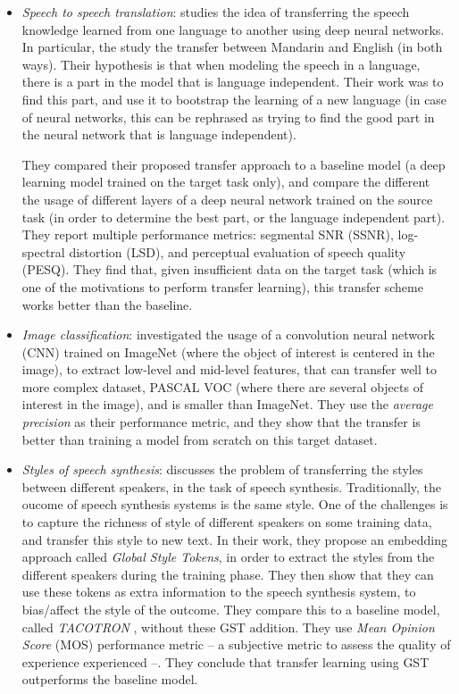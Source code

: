 \begin{itemize}
      \item \textit{Speech to speech translation}: \citep{xu2014cross} studies the idea of transferring the speech knowledge learned from one language to another using deep neural networks. In particular, the study the transfer between Mandarin and English (in both ways). Their hypothesis is that when modeling the speech in a language, there is a part in the model that is language independent. Their work was to find this part, and use it to bootstrap the learning of a new language (in case of neural networks, this can be rephrased as trying to find the good part in the neural network that is language independent).

      They compared their proposed transfer approach to a baseline model (a deep learning model trained on the target task only), and compare the different the usage of different layers of a deep neural network trained on the source task (in order to determine the best part, or the language independent part). They report multiple performance metrics: segmental SNR (SSNR), log-spectral distortion (LSD), and perceptual evaluation of speech quality (PESQ). They find that, given insufficient data on the target task (which is one of the motivations to perform transfer learning), this transfer scheme works better than the baseline.

      \item \textit{Image classification}: \citep{oquab2014learning} investigated the usage of a convolution neural network (CNN) trained on ImageNet \citep{imagenet_cvpr09} (where the object of interest is centered in the image), to extract low-level and mid-level features, that can transfer well to more complex dataset, PASCAL VOC \citep{everingham2010pascal} (where there are several objects of interest in the image), and is smaller than ImageNet. They use the \textit{average precision} as their performance metric, and they show that the transfer is better than training a model from scratch on this target dataset.

      \item \textit{Styles of speech synthesis}: \citep{wang2018style} discusses the problem of transferring the styles between different speakers, in the task of speech synthesis. Traditionally, the oucome of speech synthesis systems is the same style. One of the challenges is to capture the richness of style of different speakers on some training data, and transfer this style to new text. In their work, they propose an embedding approach called \textit{Global Style Tokens}, in order to extract the styles from the different speakers during the training phase. They then show that they can use these tokens as extra information to the speech synthesis system, to bias/affect the style of the outcome.
      They compare this to a baseline model, called \textit{TACOTRON} \citep{wang2017tacotron}, without these GST addition. They use \textit{Mean Opinion Score} (MOS) performance metric -- a subjective metric to assess the quality of experience experienced --. They conclude that transfer learning using GST outperforms the baseline model.

    \end{itemize}

